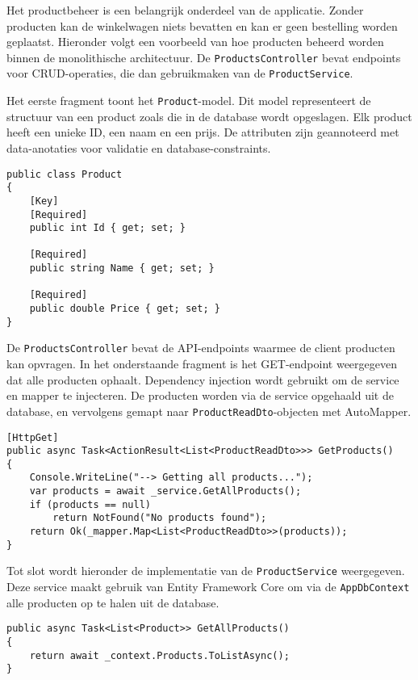 Het productbeheer is een belangrijk onderdeel van de applicatie. Zonder producten kan de winkelwagen niets bevatten en kan er geen bestelling worden geplaatst. Hieronder volgt een voorbeeld van hoe producten beheerd worden binnen de monolithische architectuur. De \texttt{ProductsController} bevat endpoints voor CRUD-operaties, die dan gebruikmaken van de \texttt{ProductService}.

\medskip
Het eerste fragment toont het \texttt{Product}-model. Dit model representeert de structuur van een product zoals die in de database wordt opgeslagen. Elk product heeft een unieke ID, een naam en een prijs. De attributen zijn geannoteerd met data-anotaties voor validatie en database-constraints.
\medskip

\begin{lstlisting}[style=mystyleA, caption=Product.cs, label=lst:MonoProductModel]
public class Product
{
	[Key]
	[Required]
	public int Id { get; set; }
	
	[Required]
	public string Name { get; set; }
	
	[Required]
	public double Price { get; set; }
}
\end{lstlisting}

\medskip
De \texttt{ProductsController} bevat de API-endpoints waarmee de client producten kan opvragen. In het onderstaande fragment is het GET-endpoint weergegeven dat alle producten ophaalt. Dependency injection wordt gebruikt om de service en mapper te injecteren. De producten worden via de service opgehaald uit de database, en vervolgens gemapt naar \texttt{ProductReadDto}-objecten met AutoMapper.
\medskip

\begin{lstlisting}[style=mystyleA, caption=ProductsController.cs (fragment), label=lst:MonoProductsController]
[HttpGet]
public async Task<ActionResult<List<ProductReadDto>>> GetProducts()
{
	Console.WriteLine("--> Getting all products...");
	var products = await _service.GetAllProducts();
	if (products == null)
		return NotFound("No products found");
	return Ok(_mapper.Map<List<ProductReadDto>>(products));
}
\end{lstlisting}

\medskip
Tot slot wordt hieronder de implementatie van de \texttt{ProductService} weergegeven. Deze service maakt gebruik van Entity Framework Core om via de \texttt{AppDbContext} alle producten op te halen uit de database.
\medskip

\begin{lstlisting}[style=mystyleA, caption=ProductService.cs (fragment), label=lst:MonoProductService]
public async Task<List<Product>> GetAllProducts()
{
	return await _context.Products.ToListAsync();
}
\end{lstlisting}

